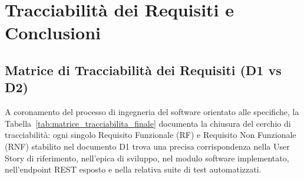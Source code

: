 \section{Tracciabilità dei Requisiti e Conclusioni}
\label{sec:tracciabilita_conclusioni}

\subsection{Matrice di Tracciabilità dei Requisiti (D1 vs D2)}
A coronamento del processo di ingegneria del software orientato alle specifiche, la Tabella~\ref{tab:matrice_tracciabilita_finale} documenta la chiusura del cerchio di tracciabilità: ogni singolo Requisito Funzionale (RF) e Requisito Non Funzionale (RNF) stabilito nel documento D1 trova una precisa corrispondenza nella User Story di riferimento, nell'epica di sviluppo, nel modulo software implementato, nell'endpoint REST esposto e nella relativa suite di test automatizzati.

